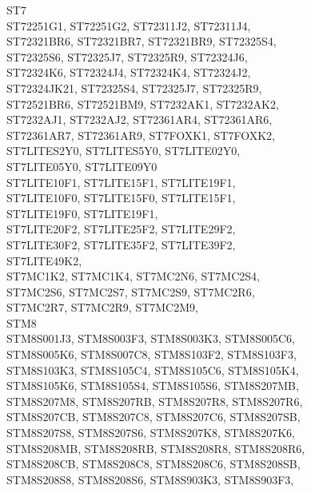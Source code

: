 \documentclass[12pt,twoside]{report}
\begin{document}
\begin{cpulist}
   ST7 \\
\> ST72251G1, ST72251G2, ST72311J2, ST72311J4, \\
\> ST72321BR6, ST72321BR7, ST72321BR9, ST72325S4, \\
\> ST72325S6, ST72325J7, ST72325R9, ST72324J6, \\
\> ST72324K6, ST72324J4, ST72324K4, ST72324J2, \\
\> ST72324JK21, ST72325S4, ST72325J7, ST72325R9, \\
\> ST72521BR6, ST72521BM9, ST7232AK1, ST7232AK2, \\
\> ST7232AJ1, ST7232AJ2, ST72361AR4, ST72361AR6, \\
\> ST72361AR7, ST72361AR9, ST7FOXK1, ST7FOXK2, \\
\> ST7LITES2Y0, ST7LITES5Y0, ST7LITE02Y0, \\
\> ST7LITE05Y0, ST7LITE09Y0 \\
\> ST7LITE10F1, ST7LITE15F1, ST7LITE19F1, \\
\> ST7LITE10F0, ST7LITE15F0, ST7LITE15F1, \\
\> ST7LITE19F0, ST7LITE19F1, \\
\> ST7LITE20F2, ST7LITE25F2, ST7LITE29F2, \\
\> ST7LITE30F2, ST7LITE35F2, ST7LITE39F2, \\
\> ST7LITE49K2, \\
\> ST7MC1K2, ST7MC1K4, ST7MC2N6, ST7MC2S4, \\
\> ST7MC2S6, ST7MC2S7, ST7MC2S9, ST7MC2R6, \\
\> ST7MC2R7, ST7MC2R9, ST7MC2M9, \\
\> STM8 \\
\> STM8S001J3, STM8S003F3, STM8S003K3, STM8S005C6,\\
\> STM8S005K6, STM8S007C8, STM8S103F2, STM8S103F3,\\
\> STM8S103K3, STM8S105C4, STM8S105C6, STM8S105K4,\\
\> STM8S105K6, STM8S105S4, STM8S105S6, STM8S207MB,\\
\> STM8S207M8, STM8S207RB, STM8S207R8, STM8S207R6,\\
\> STM8S207CB, STM8S207C8, STM8S207C6, STM8S207SB,\\
\> STM8S207S8, STM8S207S6, STM8S207K8, STM8S207K6,\\
\> STM8S208MB, STM8S208RB, STM8S208R8, STM8S208R6,\\
\> STM8S208CB, STM8S208C8, STM8S208C6, STM8S208SB,\\
\> STM8S208S8, STM8S208S6, STM8S903K3, STM8S903F3,\\

\end{cpulist}
\end{document}
